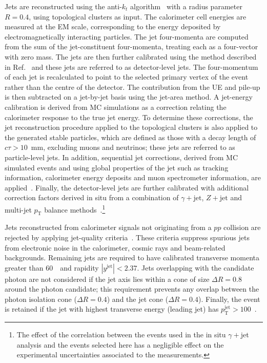 \documentclass[cernpreprint,texlive=2016,txfonts,UKenglish]{latex/atlasdoc}
\def\rapjet{y^{\mathrm{jet}}}
\def\ptjet{p_{\mathrm{T}}^{\text{jet}}}
\begin{document}
Jets are reconstructed using the anti-$k_t$
algorithm~\cite{jhep:0804:063,epj:c72:1896} with a radius parameter
$R=0.4$, using topological clusters as input. The calorimeter cell
energies are measured at the EM scale, corresponding to the energy
deposited by electromagnetically interacting particles. The jet
four-momenta are computed from the sum of the jet-constituent
four-momenta, treating each as a four-vector with zero mass. The jets
are then further calibrated using the method described in
Ref.~\cite{pr:d96:072002} and these jets are referred to as
detector-level jets. The four-momentum of each jet is recalculated to
point to the selected primary vertex of the event rather than the
centre of the detector. The contribution from the UE and pile-up is
then subtracted on a jet-by-jet basis using the jet-area method. A
jet-energy calibration is derived from MC simulations as a correction
relating the calorimeter response to the true jet energy. To determine
these corrections, the jet reconstruction procedure applied to the
topological clusters is also applied to the generated stable
particles, which are defined as those with a decay length of
$c\tau>10$~mm, excluding muons and neutrinos; these jets are referred
to as particle-level jets. In addition, sequential jet corrections,
derived from MC simulated events and using global properties of the
jet such as tracking information, calorimeter energy deposits and muon
spectrometer information, are
applied~\cite{ATLAS-CONF-2015-002}. Finally, the detector-level jets
are further calibrated with additional correction factors derived in
situ from a combination of $\gamma+{\mathrm{jet}}$, $Z+{\mathrm{jet}}$
and multi-jet $p_{\mathrm{T}}$ balance
methods~\cite{epj:c75:17,ATLAS-CONF-2015-037}.\footnote{The effect of
  the correlation between the events used in the in situ $\gamma+$jet
  analysis and the events selected here has a negligible effect on the
  experimental uncertainties associated to the measurements.}

Jets reconstructed from calorimeter signals not originating from a
$pp$ collision are rejected by applying jet-quality
criteria~\cite{epj:c75:17,epj:c73:2304}. These criteria suppress
spurious jets from electronic noise in the calorimeter, cosmic rays
and beam-related backgrounds. Remaining jets are required to have
calibrated transverse momenta greater than $60$~\GeV\ and rapidity
$|\rapjet|<2.37$. Jets overlapping with the candidate photon are not
considered if the jet axis lies within a cone of size $\Delta R=0.8$
around the photon candidate; this requirement prevents any overlap
between the photon isolation cone ($\Delta R=0.4$) and the jet cone
($\Delta R=0.4$). Finally, the event is retained if the jet with
highest transverse energy (leading jet) has $\ptjet>100$~\GeV.
\end{document}
